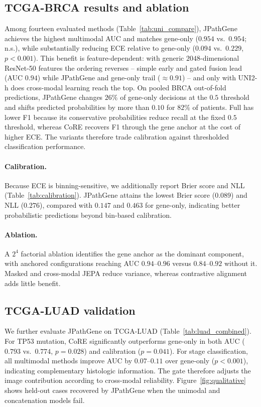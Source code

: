 \subsection{TCGA-BRCA results and ablation}
\label{sec:uni}
Among fourteen evaluated methods (Table~\ref{tab:uni_compare}), JPathGene
achieves the highest multimodal AUC and matches gene-only
($0.954$ vs.\ $0.954$; n.s.), while substantially reducing ECE relative to
gene-only ($0.094$ vs.\ $0.229$, $p\!<\!0.001$). This benefit is feature-dependent: with generic $2048$-dimensional ResNet-50
features the ordering reverses -- simple early and gated fusion lead (AUC $0.94$)
while JPathGene and gene-only trail ($\approx\!0.91$) -- and only with UNI2-h does
cross-modal learning reach the top. On pooled BRCA out-of-fold predictions,
JPathGene changes $26\%$ of gene-only decisions at the $0.5$ threshold and shifts
predicted probabilities by more than $0.10$ for $82\%$ of patients. Full has
lower F1 because its conservative probabilities reduce recall at the fixed
$0.5$ threshold, whereas CoRE recovers F1 through the gene anchor at the cost
of higher ECE. The variants therefore trade calibration against thresholded
classification performance.


\paragraph{Calibration.}
\label{sec:calib}
Because ECE is binning-sensitive, we additionally report Brier score and NLL
(Table~\ref{tab:calibration}). JPathGene attains the lowest Brier score ($0.089$)
and NLL ($0.276$), compared with $0.147$ and $0.463$ for gene-only, indicating
better probabilistic predictions beyond bin-based calibration.


\paragraph{Ablation.}
A $2^4$ factorial ablation identifies the gene anchor as the dominant component,
with anchored configurations reaching AUC $0.94$--$0.96$ versus
$0.84$--$0.92$ without it. Masked and cross-modal JEPA reduce variance,
whereas contrastive alignment adds little benefit.

\subsection{TCGA-LUAD validation}
\label{sec:luad}
We further evaluate JPathGene on TCGA-LUAD
(Table~\ref{tab:luad_combined}). For TP53 mutation, CoRE significantly
outperforms gene-only in both AUC ($0.793$ vs.\ $0.774$, $p\!=\!0.028$)
and calibration ($p\!=\!0.041$). For stage classification, all multimodal
methods improve AUC by $0.07$--$0.11$ over gene-only ($p\!<\!0.001$),
indicating complementary histologic information. The gate therefore adjusts
the image contribution according to cross-modal reliability.
Figure~\ref{fig:qualitative} shows held-out cases recovered by JPathGene when
the unimodal and concatenation models fail.

